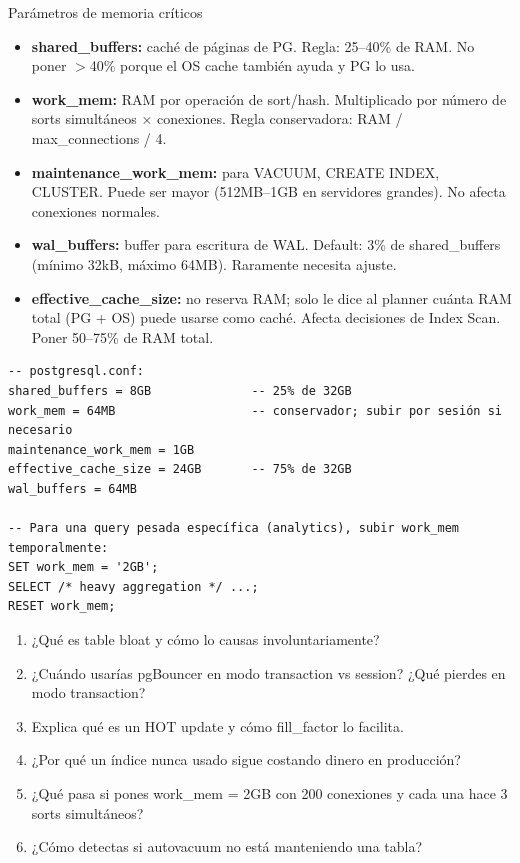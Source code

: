\begin{teoriabox}{Parámetros de memoria críticos}
\begin{itemize}
  \item \textbf{shared\_buffers:} caché de páginas de PG. Regla: 25--40\% de RAM. No poner $>$40\% porque el OS cache también ayuda y PG lo usa.
  \item \textbf{work\_mem:} RAM por operación de sort/hash. Multiplicado por número de sorts simultáneos × conexiones. Regla conservadora: RAM / max\_connections / 4.
  \item \textbf{maintenance\_work\_mem:} para VACUUM, CREATE INDEX, CLUSTER. Puede ser mayor (512MB--1GB en servidores grandes). No afecta conexiones normales.
  \item \textbf{wal\_buffers:} buffer para escritura de WAL. Default: 3\% de shared\_buffers (mínimo 32kB, máximo 64MB). Raramente necesita ajuste.
  \item \textbf{effective\_cache\_size:} no reserva RAM; solo le dice al planner cuánta RAM total (PG + OS) puede usarse como caché. Afecta decisiones de Index Scan. Poner 50--75\% de RAM total.
\end{itemize}
\end{teoriabox}

\begin{lstlisting}[caption={Configuración de memoria recomendada (servidor 32GB)}]
-- postgresql.conf:
shared_buffers = 8GB              -- 25% de 32GB
work_mem = 64MB                   -- conservador; subir por sesión si necesario
maintenance_work_mem = 1GB
effective_cache_size = 24GB       -- 75% de 32GB
wal_buffers = 64MB

-- Para una query pesada específica (analytics), subir work_mem temporalmente:
SET work_mem = '2GB';
SELECT /* heavy aggregation */ ...;
RESET work_mem;
\end{lstlisting}

\begin{entrevistabox}
\begin{enumerate}
  \item ¿Qué es table bloat y cómo lo causas involuntariamente?
  \item ¿Cuándo usarías pgBouncer en modo transaction vs session? ¿Qué pierdes en modo transaction?
  \item Explica qué es un HOT update y cómo fill\_factor lo facilita.
  \item ¿Por qué un índice nunca usado sigue costando dinero en producción?
  \item ¿Qué pasa si pones work\_mem = 2GB con 200 conexiones y cada una hace 3 sorts simultáneos?
  \item ¿Cómo detectas si autovacuum no está manteniendo una tabla?
\end{enumerate}
\end{entrevistabox}
